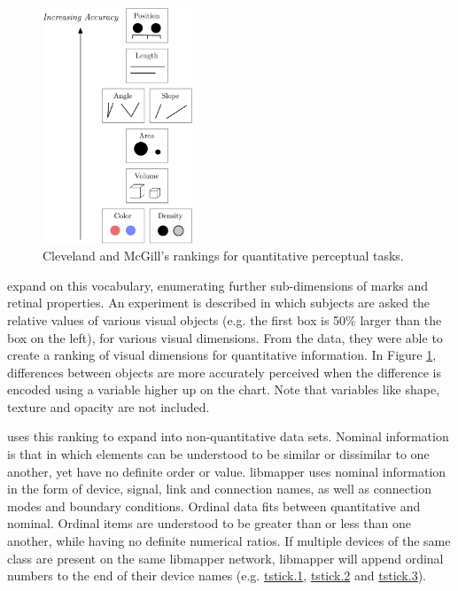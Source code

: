 \begin{figure}
	\centering
		\includegraphics[width=0.4\textwidth]{figures/accuracy_of_visual_dimensions}
		\caption{Cleveland and McGill's rankings for quantitative perceptual tasks.}
		\label{fig:accuracy_of_visual_dimensions}
\end{figure}

 expand on this vocabulary, enumerating further sub-dimensions of marks and retinal properties. An experiment is described in which subjects are asked the relative values of various visual objects (e.g. the first box is 50\% larger than the box on the left), for various visual dimensions. From the data, they were able to create a ranking of visual dimensions for quantitative information. In Figure \ref{fig:accuracy_of_visual_dimensions}, differences between objects are more accurately perceived when the difference is encoded using a variable higher up on the chart. Note that variables like shape, texture and opacity are not included. 


 uses this ranking to expand into non-quantitative data sets. Nominal information is that in which elements can be understood to be similar or dissimilar to one another, yet have no definite order or value. libmapper uses nominal information in the form of device, signal, link and connection names, as well as connection modes and boundary conditions. Ordinal data fits between quantitative and nominal. Ordinal items are understood to be greater than or less than one another, while having no definite numerical ratios. If multiple devices of the same class are present on the same libmapper network, libmapper will append ordinal numbers to the end of their device names (e.g. \url{tstick.1}, \url{tstick.2} and \url{tstick.3}).

